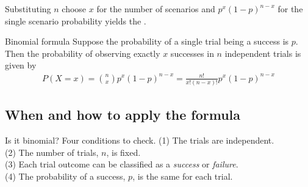 Substituting $n$ choose $x$ for the number of scenarios
and $p^x(1-p)^{n-x}$ for the single scenario probability
yields the .
\B{\newpage}

\begin{onebox}{Binomial formula}
Suppose the probability of a single trial being a success is $p$. Then the probability of observing exactly $x$ successes in $n$ independent trials is given by\vspace{-1mm}
\begin{eqnarray*}
P(X=x)={n\choose x}p^x(1-p)^{n-x} = \frac{n!}{x!(n-x)!}p^x(1-p)^{n-x}
\label{binomialFormula}
\end{eqnarray*}
\end{onebox}



\subsection{When and how to apply the formula}

\begin{onebox}{Is it binomial? Four conditions to check.}
  \label{isItBinomialTipBox}%
  (1) The trials are independent. \\
  (2) The number of trials, $n$, is fixed. \\
  (3) Each trial outcome can be classified as a \emph{success}
      or \emph{failure}. \\
  (4) The probability of a success, $p$, is the same for
      each trial.
\end{onebox}

